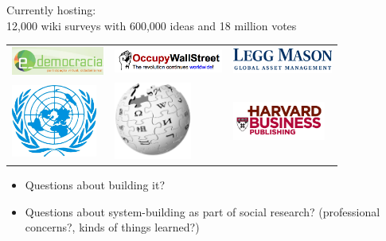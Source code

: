 \documentclass[aspectratio=169]{beamer}
\def\vf{\vfill}
\begin{document}
\begin{frame}

Currently hosting:\\
12,000 wiki surveys with 600,000 ideas and 18 million votes
\vf

\begin{center}
\begin{tabular}{m{1.4in} m{1.4in} m{1.4in}}
\includegraphics[width=1.2in]{figures/edemocracia} & \includegraphics[width=1.4in]{figures/ows_horizontal} & \includegraphics[width=1.3in]{figures/legg_mason_logo}\\
\vspace{0.2in}
\includegraphics[width=1.1in]{figures/un_logo_white_bkg} & \includegraphics[width=1in]{figures/200px-Wikipedia-logo} & \includegraphics[width=1.2in]{figures/harvard_business_publishing}
\end{tabular}
\end{center}

\end{frame}
\begin{frame}

\begin{itemize}
\item Questions about building it?
\item Questions about system-building as part of social research? (professional concerns?, kinds of things learned?)
\end{itemize}

\end{frame}
\end{document}
